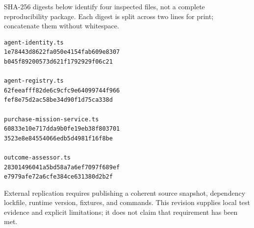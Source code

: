 \documentclass[
  11pt,
  letterpaper,
]{article}
\begin{document}
SHA-256 digests below identify four inspected files, not a complete
reproducibility package. Each digest is split across two lines for
print; concatenate them without whitespace.

\begin{verbatim}
agent-identity.ts
1e78443d8622fa050e4154fab609e8307
b045f89200573d621f1792929f06c21

agent-registry.ts
62feeafff82de6c9cfc9e64099744f966
fef8e75d2ac58be34d90f1d75ca338d

purchase-mission-service.ts
60833e10e717dda9b0fe19eb38f803701
3523e8e84554066edb5d4981f16f8be

outcome-assessor.ts
28301496041a5bd58a7a6ef7097f689ef
e7979afe72a6cfe384ce631380d2b2f
\end{verbatim}

External replication requires publishing a coherent source snapshot,
dependency lockfile, runtime version, fixtures, and commands. This
revision supplies local test evidence and explicit limitations; it does
not claim that requirement has been met.
\end{document}
